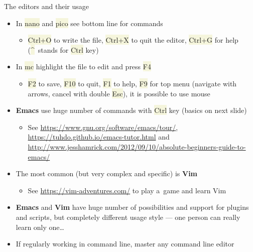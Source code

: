 \documentclass[compress, ucs, xelatex, 11pt, xcolor=svgnames, aspectratio=169,
	hyperref={
		bookmarks=true,
		unicode=true,
		colorlinks=true,
		pdftitle={Linux, command line and MetaCentrum},
		plainpages=false,
		pdfauthor={Vojtech Zeisek},
		pdfsubject={Course about use of Linux command line, writing shell scripts and using MetaCentrum of CESNET},
		pdfcreator={XeLaTeX},
		pdfkeywords={Linux, GNU, BASH, shell, command line, MetaCentrum},
		linkcolor=DarkRed, %
		anchorcolor=DarkBlue, %
		citecolor=Indigo, %
		filecolor=NavyBlue, %
		menucolor=DarkMagenta, %
		urlcolor=DarkBlue, %
		pdftex},
	url={hyphens, lowtilde} %
	]{beamer}
\renewcommand{\texttt}[1]{\colorbox{Beige}{{\ttfamily #1}}}
\begin{document}
\begin{frame}{The editors and their usage}
	\begin{itemize}
		\item In \texttt{nano} and \texttt{pico} see bottom line for commands
		\begin{itemize}
			\item \texttt{Ctrl+O} to write the file, \texttt{Ctrl+X} to quit the editor, \texttt{Ctrl+G} for help (\texttt{\textasciicircum}~stands for \texttt{Ctrl} key)
		\end{itemize}
		\item In \texttt{mc} highlight the file to edit and press \texttt{F4}
		\begin{itemize}
			\item \texttt{F2} to save, \texttt{F10} to quit, \texttt{F1} to help, \texttt{F9} for top menu (navigate with arrows, cancel with double \texttt{Esc}), it is possible to use mouse
		\end{itemize}
		\item \textbf{Emacs} use huge number of commands with \texttt{Ctrl} key (basics on next slide)
		\begin{itemize}
			\item See \url{https://www.gnu.org/software/emacs/tour/}, \url{https://tuhdo.github.io/emacs-tutor.html} and \url{http://www.jesshamrick.com/2012/09/10/absolute-beginners-guide-to-emacs/}
		\end{itemize}
		\item The most common (but very complex and specific) is \textbf{Vim}
		\begin{itemize}
			\item See \url{https://vim-adventures.com/} to play a~game and learn Vim
		\end{itemize}
		\item \textbf{Emacs} and \textbf{Vim} have huge number of possibilities and support for plugins and scripts, but completely different usage style --- one person can really learn only one\ldots
		\item If regularly working in command line, master any command line editor
	\end{itemize}
\end{frame}
\end{document}
